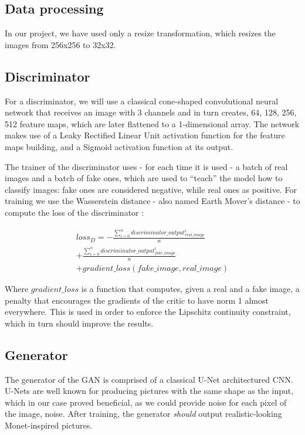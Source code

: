 \documentclass[conference]{IEEEtran}
\begin{document}
\subsection{Data processing}
    In our project, we have used only a resize transformation, which resizes the images from 256x256 to 32x32.

\subsection{Discriminator}
    For a discriminator, we will use a classical cone-shaped convolutional neural network that receives an image with 3 channels
and in turn creates, 64, 128, 256, 512 feature maps, which are later flattened to a 1-dimensional array. The network makes use
of a Leaky Rectified Linear Unit activation function for the feature maps building, and a Sigmoid activation function at its
output.

    The trainer of the discriminator uses - for each time it is used - a batch of real images and a batch of fake ones, which are used
to ``teach'' the model how to classify images: fake ones are considered negative, while real ones as positive. For training we use
the Wasserstein distance - also named Earth Mover's distance - to compute the loss of the discriminator \cite{b2}:

\begin{multline}
    loss_{D} = - \frac{\sum_{i=0}^{n} discriminator\_output_{real\_image}^i}{n} \\
               + \frac{\sum_{i=0}^{n} discriminator\_output_{fake\_image}^i}{n} \\
               + gradient\_loss(fake\_image, real\_image)
\end{multline}

    Where $gradient\_loss$ is a function that computes, given a real and a fake image, a penalty that encourages the gradients
of the critic to have norm 1 almost everywhere. This is used in order to enforce the Lipschitz continuity constraint, which
in turn should improve the results.

\subsection{Generator}
    The generator of the GAN is comprised of a classical U-Net architectured CNN. U-Nets are well known for producing pictures
with the same shape as the input, which in our case proved beneficial, as we could provide noise for each pixel of the image,
noise. After training, the generator \textit{should} output realistic-looking Monet-inspired pictures.
\end{document}
